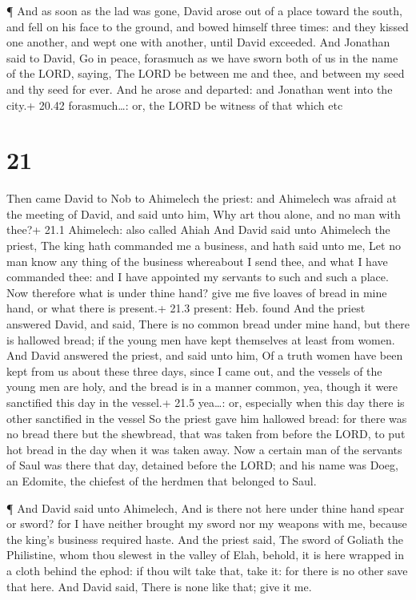  ¶ And as soon as the lad was gone, David arose out of a
place toward the south, and fell on his face to the ground, and bowed
himself three times: and they kissed one another, and wept one with
another, until David exceeded.  And Jonathan said to David,
Go in peace, forasmuch as we have sworn both of us in the name of the
LORD, saying, The LORD be between me and thee, and between my seed and
thy seed for ever. And he arose and departed: and Jonathan went into the
city.+ 20.42 forasmuch\ldots: or, the LORD be witness of that which etc

\hypertarget{section-20}{%
\section{21}\label{section-20}}

 Then came David to Nob to Ahimelech the priest: and
Ahimelech was afraid at the meeting of David, and said unto him, Why art
thou alone, and no man with thee?+ 21.1 Ahimelech: also called Ahiah
 And David said unto Ahimelech the priest, The king hath
commanded me a business, and hath said unto me, Let no man know any
thing of the business whereabout I send thee, and what I have commanded
thee: and I have appointed my servants to such and such a place.
 Now therefore what is under thine hand? give me five loaves
of bread in mine hand, or what there is present.+ 21.3 present: Heb.
found  And the priest answered David, and said, There is no
common bread under mine hand, but there is hallowed bread; if the young
men have kept themselves at least from women.  And David
answered the priest, and said unto him, Of a truth women have been kept
from us about these three days, since I came out, and the vessels of the
young men are holy, and the bread is in a manner common, yea, though it
were sanctified this day in the vessel.+ 21.5 yea\ldots: or, especially
when this day there is other sanctified in the vessel  So
the priest gave him hallowed bread: for there was no bread there but the
shewbread, that was taken from before the LORD, to put hot bread in the
day when it was taken away.  Now a certain man of the
servants of Saul was there that day, detained before the LORD; and his
name was Doeg, an Edomite, the chiefest of the herdmen that belonged to
Saul.

 ¶ And David said unto Ahimelech, And is there not here
under thine hand spear or sword? for I have neither brought my sword nor
my weapons with me, because the king's business required haste.
 And the priest said, The sword of Goliath the Philistine,
whom thou slewest in the valley of Elah, behold, it is here wrapped in a
cloth behind the ephod: if thou wilt take that, take it: for there is no
other save that here. And David said, There is none like that; give it
me.

